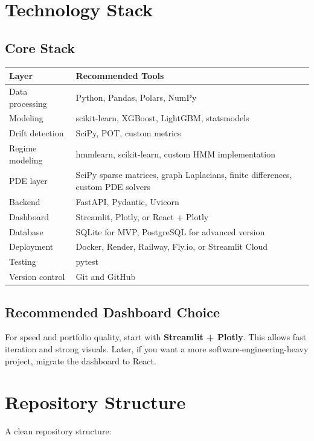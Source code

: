 \documentclass[11pt]{article}
\begin{document}
\section{Technology Stack}

\subsection{Core Stack}

\begin{longtable}{p{}p{}}
\toprule
\textbf{Layer} & \textbf{Recommended Tools} \\
\midrule
Data processing & Python, Pandas, Polars, NumPy \\
Modeling & scikit-learn, XGBoost, LightGBM, statsmodels \\
Drift detection & SciPy, POT, custom metrics \\
Regime modeling & hmmlearn, scikit-learn, custom HMM implementation \\
PDE layer & SciPy sparse matrices, graph Laplacians, finite differences, custom PDE solvers \\
Backend & FastAPI, Pydantic, Uvicorn \\
Dashboard & Streamlit, Plotly, or React + Plotly \\
Database & SQLite for MVP, PostgreSQL for advanced version \\
Deployment & Docker, Render, Railway, Fly.io, or Streamlit Cloud \\
Testing & pytest \\
Version control & Git and GitHub \\
\bottomrule
\end{longtable}

\subsection{Recommended Dashboard Choice}

For speed and portfolio quality, start with \textbf{Streamlit + Plotly}. This allows fast iteration and strong visuals. Later, if you want a more software-engineering-heavy project, migrate the dashboard to React.

\section{Repository Structure}

A clean repository structure:
\end{document}
